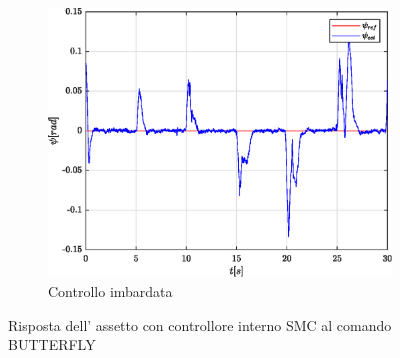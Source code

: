 \begin{figure}
	\hfill
	\begin{subfigure}{0.45\textwidth}
		\centering
		\includegraphics[width=1\textwidth]{Simulazioni/Figure/SMC/BUTTERFLY/AttitudeControlYaw}
		\caption{Controllo imbardata}
		\label{fig:BUTTERFLYyawSMC}
	\end{subfigure}
	\caption{Risposta dell' assetto con controllore interno SMC al comando BUTTERFLY}
\end{figure}

